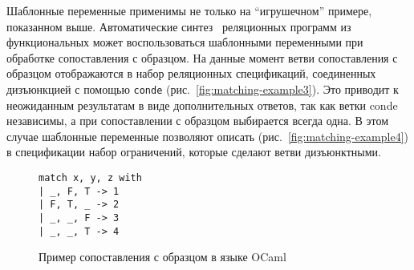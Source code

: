 Шаблонные переменные применимы не только на \enquote{игрушечном} примере, показанном выше.
Автоматические синтез~\cite{Lozov2018} реляционных программ из функциональных может воспользоваться шаблонными переменными при обработке сопоставления с образцом.
На данные момент ветви сопоставления с образцом отображаются в набор реляционных спецификаций, соединенных дизъюнкцией с помощью \verb=conde= (рис.~\ref{fig:matching-example3}).
Это приводит к неожиданным результатам в виде дополнительных ответов, так как ветки conde независимы, а при сопоставлении с образцом выбирается всегда одна.
В этом случае шаблонные переменные позволяют описать (рис.~\ref{fig:matching-example4}) в спецификации набор ограничений, которые сделают ветви дизъюнктными.


\begin{figure*}[t]
  \centering
  \renewcommand\thesubfigure{\alph{subfigure}1}
  \begin{lstlisting}
match x, y, z with
| _, F, T -> 1
| F, T, _ -> 2
| _, _, F -> 3
| _, _, T -> 4
  \end{lstlisting}
  \vskip4.5mm
  \caption{Пример сопоставления с образцом в языке OCaml}
  \label{fig:matching-example1}
\end{figure*}

